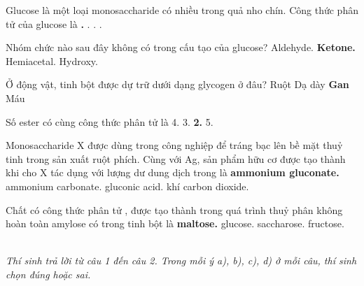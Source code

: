 \documentclass[11pt,a4paper]{article}
\begin{document}
\begin{ex}
Glucose là một loại monosaccharide có nhiều trong quả nho chín. Công thức phân tử của glucose là
\choice
{\textbf{\color{hfRed}.}}
{.}
{.}
{.}
\end{ex}
\begin{ex}
Nhóm chức nào sau đây không có trong cấu tạo của glucose?
\choice
{Aldehyde.}
{\textbf{\color{hfRed}Ketone.}}
{Hemiacetal.}
{Hydroxy.}
\end{ex}
\begin{ex}
Ở động vật, tinh bột được dự trữ dưới dạng glycogen ở đâu?
\choice
{Ruột}
{Dạ dày}
{\textbf{\color{hfRed}Gan}}
{Máu}
\end{ex}
\begin{ex}
Số ester có cùng công thức phân tử  là
\choice
{4.}
{3.}
{\textbf{\color{hfRed}2.}}
{5.}
\end{ex}
\begin{ex}
Monosaccharide X được dùng trong công nghiệp để tráng bạc lên bề mặt thuỷ tinh trong sản xuất ruột phích. Cùng với Ag, sản phẩm hữu cơ được tạo thành khi cho X tác dụng với lượng dư dung dịch  trong  là
\choice
{\textbf{\color{hfRed}ammonium gluconate.}}
{ammonium carbonate.}
{gluconic acid.}
{khí carbon dioxide.}
\end{ex}
\begin{ex}
Chất có công thức phân tử , được tạo thành trong quá trình thuỷ phân không hoàn toàn amylose có trong tinh bột là
\choice
{\textbf{\color{hfRed}maltose.}}
{glucose.}
{saccharose.}
{fructose.}
\end{ex}

\vspace{6pt}
 \\
\textit{Thí sinh trả lời từ câu 1 đến câu 2. Trong mỗi ý a), b), c), d) ở mỗi câu, thí sinh chọn đúng hoặc sai.}
\vspace{4pt}
\end{document}
